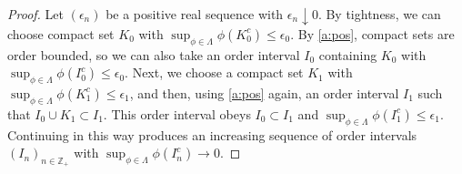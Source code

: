 \documentclass[12pt,reqno]{amsart}
\numberwithin{equation}{section}
\theoremstyle{definition}
\newcommand{\1}{\mathbbm{1}}
\newcommand{\Z}{\mathbb{Z}}
\begin{document}
\begin{proof}
    Let $(\epsilon_n)$ be a positive real sequence with $\epsilon_n \downarrow
    0$.  By tightness, we can choose compact set $K_0$ with $\sup_{\phi \in
    \Lambda} \phi(K_0^c) \leq \epsilon_0$.  By \cref{a:pos}, compact sets are order
    bounded, so we
    can also take an order interval $I_0$ containing $K_0$ with $\sup_{\phi \in
    \Lambda} \phi(I_0^c) \leq \epsilon_0$. Next, we choose a compact set $K_1$ with
    $\sup_{\phi \in \Lambda} \phi(K_1^c) \leq \epsilon_1$, and then, using
    \cref{a:pos} again, an order interval $I_1$ such that $I_0 \cup
    K_1 \subset I_1$.  This order interval obeys $I_0 \subset I_1$ and
    $\sup_{\phi \in \Lambda} \phi(I_1^c) \leq \epsilon_1$.  Continuing in this way
    produces an increasing sequence of order intervals $(I_n)_{n \in \Z_+}$
    with $\sup_{\phi \in \Lambda} \phi(I_n^c) \to 0$.
\end{proof}
\end{document}
